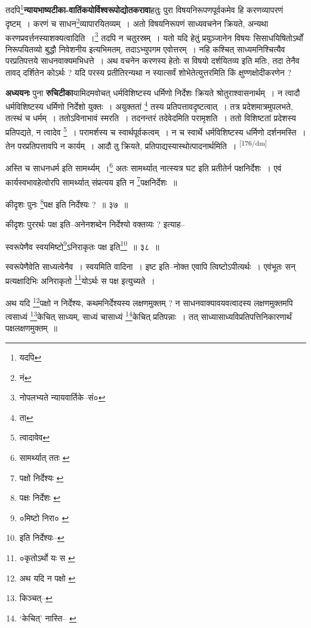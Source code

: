 \documentclass[article,12pt,a4paper]{memoir}
\begin{document}
	  \pstart तदपि\footnote{यदपि}\textbf{न्यायभाष्यटीका-वातिंकयोर्विश्वरूपोद्योतकरावा}हतुः पुरा विषयनिरूपणपूर्वकमेव हि करणव्यापरणं दृष्टम् । करणं च साधन\footnote{नं}व्यापारयितव्यम् । अतो विषयनिरूपणं साध्यवचनेन क्रियते, अन्यथा करणप्रवर्त्तनस्याशक्यत्वादिति ।\footnote{नोपलभ्यते न्यायवार्तिके--सं०} तदपि न चतुरस्रम् । यतो यदि हेतुं प्रयुञ्जानेन विषयः सिसाधयिषितोऽर्थों निरूपयितव्यो बुद्धौ निवेशनीय इत्यभिमतम्, तदाऽभ्युपगम एवोत्तरम् । नहि कश्चित् साध्यमनिश्चित्यैव परप्रतिपत्तये साधनवाक्यमभिधत्ते । अथ वचनेन करणस्य हेतोः स विषयो दर्शयितव्य इति मतिः, तदा तेनैव तावद् दर्शितेन कोऽर्थः ? यदि परस्य प्रतीतिरन्यथा न स्यात्सर्वं शोभेतेत्युत्तरमिति किं क्षुण्णक्षोदीकरणेन ?
	\pend
      

	  \pstart \textbf{अध्ययनः} पुना \textbf{रुचिटीका}यामिदमवोचत् धर्मविशिष्टस्य धर्मिणो निर्देशः क्रियते श्रोतुराश्वासनार्थम् । न त्वादौ धर्मविशिष्टस्य धर्मिणो निर्देशो युक्तः । अयुक्ततां \footnote{ता} तस्य प्रतिपत्तावदृष्टत्वात् । तत्र प्रदेशमात्रमुपलभते, तत्स्थं च धर्मम् । ततोऽविनाभावं स्मरति । तदनन्तरं तदेवेदमिति परामृशति । ततो विशिष्टतां प्रदेशस्य प्रतिपद्यते, न त्वादेव \footnote{त्वादावेव} । परामर्शस्य च स्वार्थपूर्वकत्वम् । न च स्वार्थे धर्मविशिष्टस्य धर्मिणो दर्शनमस्ति । तेन परप्रतिपत्तावपि न कार्यम् । आदौ तु क्रियते, प्रतिपाद्यस्यास्थोत्पादनार्थमिति । \leavevmode\textsuperscript{\rmlatinfont\tiny [176/dm]} 
	  
	अस्ति च साधनधर्म इति सामर्थ्यम् ।\footnote{सामर्थ्यात् ततः \cite{dp-msA} \cite{dp-msB} \cite{dp-edP} \cite{dp-edH} \cite{dp-edN}} अतः सामर्थ्यात् नात्स्यत्र घट इति प्रतीतेर्न पक्षनिर्देशः । एवं कार्यस्वभावहेत्वोरपि सामर्थ्यात् संप्रत्यय इति न \footnote{पक्षो निर्देश्यः \cite{dp-edE}}पक्षनिर्देशः ॥ 
	  
	कीदृशः पुनः \footnote{पक्षः निर्देशः \cite{dp-msC}}पक्ष इति निर्देश्यः ? ॥ ३७ ॥ 
	  
	कीदृशः पुररर्थः पक्ष इति--अनेनशब्देन निर्देश्यो वक्तव्यः ? इत्याह-- 
	  
	स्वरूपेणैव स्वयमिष्टो\footnote{०मिष्टो निरा० \cite{dp-msB} \cite{dp-edP}}ऽनिराकृतः पक्ष इति\footnote{इति निर्देश्यः--\cite{dp-msC}} ॥ ३८ ॥ 
	  
	स्वरूपेणैवेति साध्यत्वेनैव । स्वयमिति वादिना । इष्ट इति--नोक्त एवापि त्विष्टोऽपीत्यर्थः । एवंभूतः सन् प्रत्यक्षादिभिः अनिराकृतो \footnote{०कृतोऽर्थो यः स \cite{dp-msB} \cite{dp-msC} \cite{dp-msD}}योऽर्थः स पक्ष इत्युच्यते । 
	  
	अथ यदि \footnote{अथ यदि न पक्षो \cite{dp-msA} \cite{dp-msB} \cite{dp-edP} \cite{dp-edH} \cite{dp-edE} \cite{dp-edN}}पक्षो न निर्देश्यः, कथमनिर्देश्यस्य लक्षणमुक्तम् ? न साधनवाक्यावयवत्वादस्य लक्षणमुक्तमपि त्वसाध्यं \footnote{किञ्चत्--\cite{dp-msB}}केचित् साध्यम्, साध्यं चासाध्यं \footnote{‘केचित्’ नास्ति--\cite{dp-msC} \cite{dp-msA} \cite{dp-edP} \cite{dp-edH} \cite{dp-edE} \cite{dp-edN}}केचित् प्रतिपन्नाः । तत् साध्यासाध्यविप्रतिपत्तिनिकारणार्थं पक्षलक्षणमुक्तम् ॥ 
	  
\end{document}
